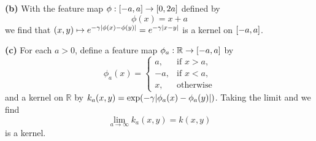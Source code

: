 \documentclass{article}
\makeatletter
\newcommand*{\shifttext}[1]{%
  \settowidth{\@tempdima}{#1}%
  \hspace{-\@tempdima}#1%
}
\newcommand{\plabel}[1]{%
\shifttext{\textbf{#1}\quad}%
}
\makeatother
\begin{document}
\plabel{(b)}%
With the feature map $\phi:\qty[-a,a] \rightarrow \qty[0,2a]$ defined by
\[ \phi(x) = x+a \]
we find that $(x,y)\mapsto e^{-\gamma\abs{\phi(x) - \phi(y)}} = e^{-\gamma\abs{x-y}}$ is a kernel on $\qty[-a,a]$.

\plabel{(c)}%
For each $a>0$, define a feature map $\phi_a:\mathbb{R}\rightarrow \qty[-a,a]$ by
\[ \phi_a(x) = \begin{cases}
    a, &\text{if } x>a,\\
    -a,&\text{if } x<a,\\
    x, &\text{otherwise}
\end{cases}
\]
and a kernel on $\mathbb{R}$ by $k_a(x,y) = \exp(-\gamma\abs{\phi_a(x) - \phi_a(y)})$.
Taking the limit and we find
\[ \lim_{a\rightarrow \infty} k_a(x,y) = k(x,y) \]
is a kernel.

% 
% 
\end{document}
